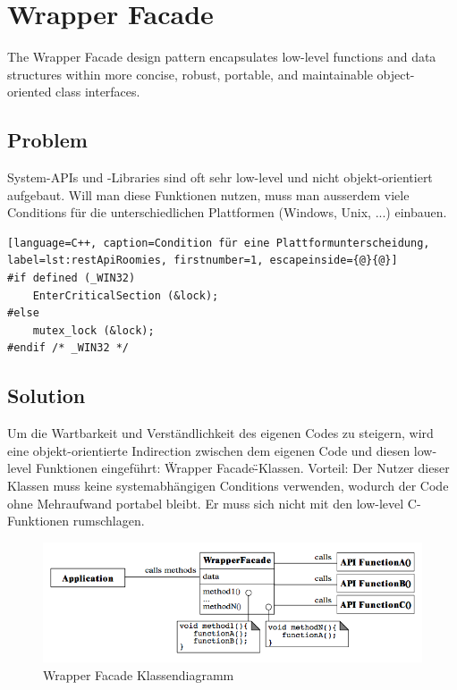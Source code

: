 \section{Wrapper Facade}
\label{sec:wrapper-facade}

The Wrapper Facade design pattern encapsulates low-level functions and data structures within more concise, robust, portable, and maintainable object-oriented class interfaces.

\subsection*{Problem}

System-APIs und -Libraries sind oft sehr low-level und nicht objekt-orientiert aufgebaut. Will man diese Funktionen nutzen, muss man ausserdem viele Conditions für die unterschiedlichen Plattformen (Windows, Unix, ...) einbauen.

\begin{lstlisting}[language=C++, caption=Condition für eine Plattformunterscheidung, label=lst:restApiRoomies, firstnumber=1, escapeinside={@}{@}]
#if defined (_WIN32)
	EnterCriticalSection (&lock);
#else
	mutex_lock (&lock);
#endif /* _WIN32 */
\end{lstlisting}


\subsection*{Solution}

Um die Wartbarkeit und Verständlichkeit des eigenen Codes zu steigern, wird eine objekt-orientierte Indirection zwischen dem eigenen Code und diesen low-level Funktionen eingeführt: \"Wrapper Facade\"-Klassen. Vorteil: Der Nutzer dieser Klassen muss keine systemabhängigen Conditions verwenden, wodurch der Code ohne Mehraufwand portabel bleibt. Er muss sich nicht mit den low-level C-Funktionen rumschlagen.

\begin{figure}[H]
	\centering
	\includegraphics[width=12cm]{content/posa2/wrapper-facade/images/class-diagram.png}
	\caption{Wrapper Facade Klassendiagramm}
\end{figure}


